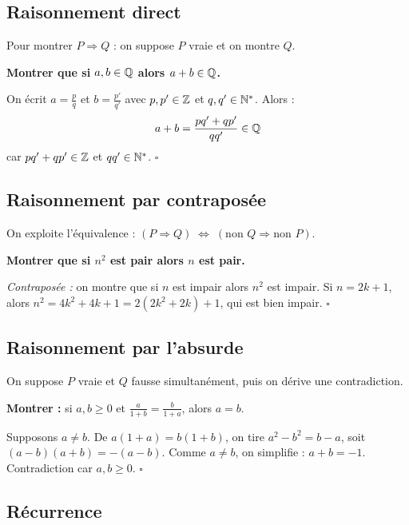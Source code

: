 \subsection{Raisonnement direct}

Pour montrer $P \Rightarrow Q$ : on suppose $P$ vraie et on montre $Q$.

\begin{exbox}
\textbf{Montrer que si $a, b \in \mathbb{Q}$ alors $a + b \in \mathbb{Q}$.}

On écrit $a = \frac{p}{q}$ et $b = \frac{p'}{q'}$ avec $p, p' \in \mathbb{Z}$ et $q, q' \in \mathbb{N}^*$. Alors :
\[
  a + b = \frac{pq' + qp'}{qq'} \in \mathbb{Q}
\]
car $pq' + qp' \in \mathbb{Z}$ et $qq' \in \mathbb{N}^*$. \hfill$\square$
\end{exbox}

\subsection{Raisonnement par contraposée}

On exploite l'équivalence : $(P \Rightarrow Q) \;\Leftrightarrow\; (\text{non } Q \Rightarrow \text{non } P)$.

\begin{exbox}
\textbf{Montrer que si $n^2$ est pair alors $n$ est pair.}

\textit{Contraposée :} on montre que si $n$ est impair alors $n^2$ est impair. Si $n = 2k+1$, alors $n^2 = 4k^2 + 4k + 1 = 2(2k^2 + 2k) + 1$, qui est bien impair. \hfill$\square$
\end{exbox}

\subsection{Raisonnement par l'absurde}

On suppose $P$ vraie et $Q$ fausse simultanément, puis on dérive une contradiction.

\begin{exbox}
\textbf{Montrer :} si $a, b \geqslant 0$ et $\frac{a}{1+b} = \frac{b}{1+a}$, alors $a = b$.

Supposons $a \neq b$. De $a(1+a) = b(1+b)$, on tire $a^2 - b^2 = b - a$, soit $(a-b)(a+b) = -(a-b)$. Comme $a \neq b$, on simplifie : $a + b = -1$. Contradiction car $a, b \geqslant 0$. \hfill$\square$
\end{exbox}

\subsection{Récurrence}

